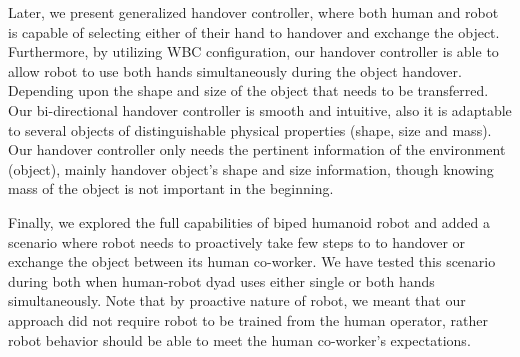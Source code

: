 Later, we present generalized handover controller, where both human and robot is capable of selecting either of their hand to handover and exchange the object. Furthermore, by utilizing WBC configuration, our handover controller is able to allow robot to use both hands simultaneously during the object handover. Depending upon the shape and size of the object that needs to be transferred. Our bi-directional handover controller is smooth and intuitive, also it is adaptable to several objects of distinguishable physical properties (shape, size and mass). Our handover controller only needs the pertinent information of the environment (object), mainly handover object's shape and size information, though knowing mass of the object is not important in the beginning.

Finally, we explored the full capabilities of biped humanoid robot and added a scenario where robot needs to proactively take few steps to to handover or exchange the object between its human co-worker. We have tested this scenario during both when human-robot dyad uses either single or both hands simultaneously. Note that by proactive nature of robot, we meant that our approach did not require robot to be trained from the human operator, rather robot behavior should be able to meet the human co-worker's expectations.

\clearpage
